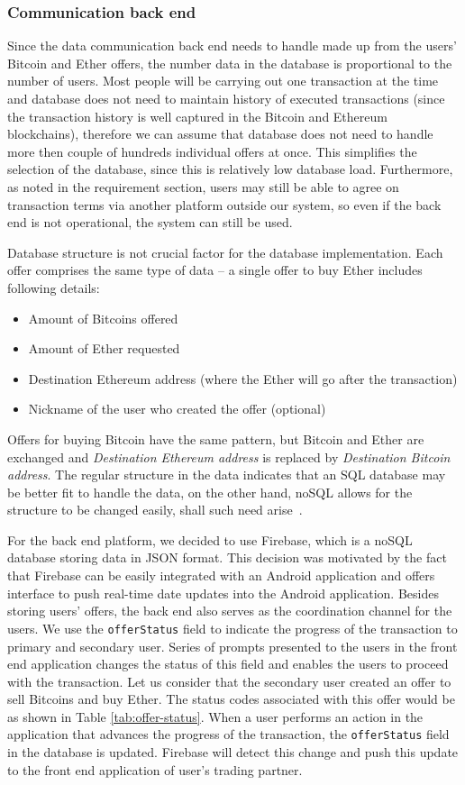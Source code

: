 \subsubsection{Communication back end}
Since the data communication back end needs to handle made up from the users' Bitcoin and Ether offers, the number data in the database is proportional to the number of users. Most people will be carrying out one transaction at the time and database does not need to maintain history of executed transactions (since the transaction history is well captured in the Bitcoin and Ethereum blockchains), therefore we can assume that database does not need to handle more then couple of hundreds individual offers at once. This simplifies the selection of the database, since this is relatively low database load. Furthermore, as noted in the requirement section, users may still be able to agree on transaction terms via another platform outside our system, so even if the back end is not operational, the system can still be used. 

Database structure is not crucial factor for the database implementation. Each offer comprises the same type of data -- a single offer to buy Ether includes following details:
\begin{itemize}[noitemsep]
    \item Amount of Bitcoins offered
    \item Amount of Ether requested
    \item Destination Ethereum address (where the Ether will go after the transaction)
    \item Nickname of the user who created the offer (optional)
\end{itemize}

Offers for buying Bitcoin have the same pattern, but Bitcoin and Ether are exchanged and \textit{Destination Ethereum address} is replaced by \textit{Destination Bitcoin address}. The regular structure in the data indicates that an SQL database may be better fit to handle the data, on the other hand, noSQL allows for the structure to be changed easily, shall such need arise~\cite{Xplenty2017TheMedium}.

For the back end platform, we decided to use Firebase, which is a noSQL database storing data in JSON format. This decision was motivated by the fact that Firebase can be easily integrated with an Android application and offers interface to push real-time date updates into the Android application. Besides storing users' offers, the back end also serves as the coordination channel for the users. We use the \texttt{offerStatus} field to indicate the progress of the transaction to primary and secondary user. Series of prompts presented to the users in the front end application changes the status of this field and enables the users to proceed with the transaction. Let us consider that the secondary user created an offer to sell Bitcoins and buy Ether. The status codes associated with this offer would be as shown in Table \ref{tab:offer-status}. When a user performs an action in the application that advances the progress of the transaction, the \texttt{offerStatus} field in the database is updated. Firebase will detect this change and push this update to the front end application of user's trading partner.

